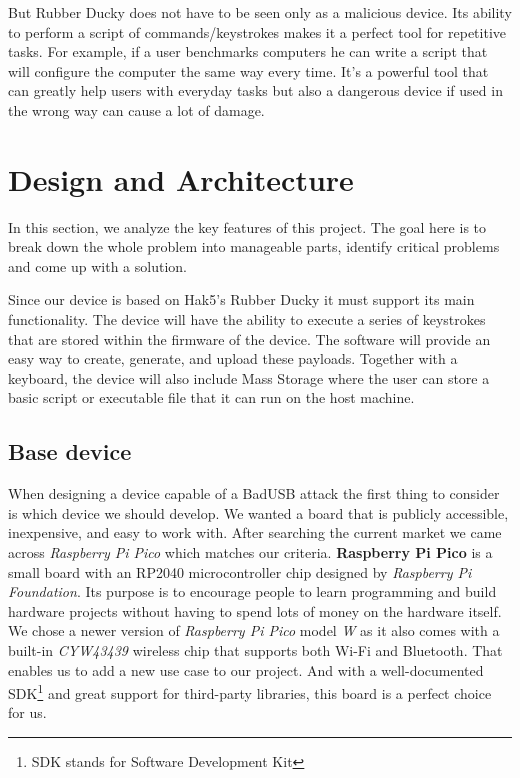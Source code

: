 But Rubber Ducky does not have to be seen only as a malicious device. Its ability to perform a script of commands/keystrokes makes it a perfect tool for repetitive tasks. For example, if a user benchmarks computers he can write a script that will configure the computer the same way every time. It's a powerful tool that can greatly help users with everyday tasks but also a dangerous device if used in the wrong way can cause a lot of damage. 


\chapter{Design and Architecture}
\label{designAndArchitecture}
In this section, we analyze the key features of this project. The goal here is to break down the whole problem into manageable parts, identify critical problems and come up with a solution. 

Since our device is based on Hak5's Rubber Ducky it must support its main functionality. The device will have the ability to execute a series of keystrokes that are stored within the firmware of the device. The software will provide an easy way to create, generate, and upload these payloads. Together with a keyboard, the device will also include Mass Storage where the user can store a basic script or executable file that it can run on the host machine.

\section{Base device}
When designing a device capable of a BadUSB attack the first thing to consider is which device we should develop. We wanted a board that is publicly accessible, inexpensive, and easy to work with. After searching the current market we came across \emph{Raspberry Pi Pico} which matches our criteria. \textbf{Raspberry Pi Pico} is a small board with an RP2040 microcontroller chip designed by \emph{Raspberry Pi Foundation}. Its purpose is to encourage people to learn programming and build hardware projects without having to spend lots of money on the hardware itself. We chose a newer version of \emph{Raspberry Pi Pico} model \emph{W} as it also comes with a built-in \emph{CYW43439} wireless chip that supports both Wi-Fi and Bluetooth. That enables us to add a new use case to our project. And with a well-documented SDK\footnote{SDK stands for Software Development Kit} and great support for third-party libraries, this board is a perfect choice for us.

